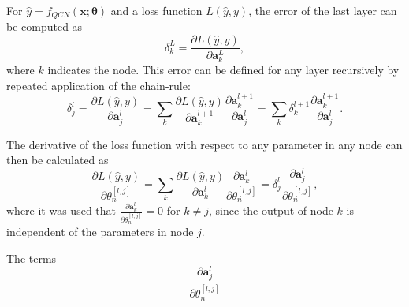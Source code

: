 For $\hat{y} = f_{QCN}(\boldsymbol{x}; \boldsymbol{\theta})$ and a loss function $L(\hat{y}, y)$, the error of the last layer can be computed as 
\begin{equation}\label{eq:lastLayerErrorQCN}
    \delta^L_k = \frac{\partial L(\hat{y}, y)}{\partial \boldsymbol{a}^L_k},
\end{equation}
where $k$ indicates the node. This error can be defined for any layer recursively by repeated application of the chain-rule:
\begin{equation}\label{eq:errorQCN}
    \delta^l_j = \frac{\partial L(\hat{y}, y)}{\partial \boldsymbol{a}^l_j} 
    = \sum_k \frac{\partial L(\hat{y}, y)}{\partial \boldsymbol{a}^{l+1}_k} \frac{\partial \boldsymbol{a}^{l+1}_k}{\partial \boldsymbol{a}^{l}_j}
    = \sum_k \delta^{l+1}_k \frac{\partial \boldsymbol{a}^{l+1}_k}{\partial \boldsymbol{a}^{l}_j}.
\end{equation}

The derivative of the loss function with respect to any parameter in any node can then be calculated as 
\begin{equation}\label{eq:derivweightsQCN}
    \frac{\partial L(\hat{y}, y)}{\partial \theta^{[l,j]}_n} = 
    \sum_k \frac{\partial L(\hat{y}, y)}{\partial \boldsymbol{a}^{l}_k} \frac{\partial \boldsymbol{a}^{l}_k}{\partial \theta^{[l,j]}_n} 
    = \delta^l_j \frac{\partial \boldsymbol{a}^{l}_j}{\partial \theta^{[l,j]}_n},
\end{equation}
where it was used that $\frac{\partial \boldsymbol{a}^{l}_k}{\partial \theta^{[l,j]}_n} = 0$ for $k \neq j$, since the output of node $k$ is independent of the parameters in node $j$. 

The terms 
\begin{equation}
     \frac{\partial \boldsymbol{a}^{l}_j}{\partial \theta^{[l,j]}_n}
\end{equation}


